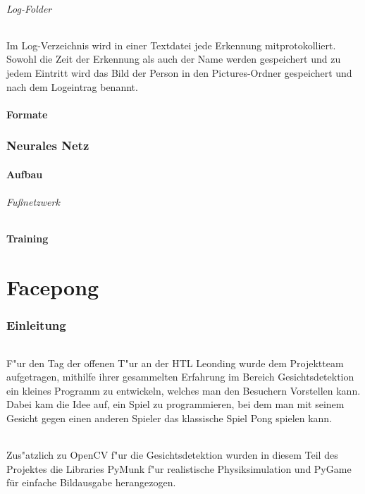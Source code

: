 \documentclass[12pt]{article}
\begin{document}
\paragraph{Log-Folder}
Im Log-Verzeichnis wird in einer Textdatei jede Erkennung mitprotokolliert.
Sowohl die Zeit der Erkennung als auch der Name werden gespeichert und zu
jedem Eintritt wird das Bild der Person in den Pictures-Ordner gespeichert
und nach dem Logeintrag benannt.
\subsection{Formate}
\label{formats}

\section{Neurales Netz}
\subsection{Aufbau}
\paragraph{Fußnetzwerk}
\label{neuralfoot}
\subsection{Training}



\part{Facepong}
\section{Einleitung}
\paragraph{}
F"ur den Tag der offenen T"ur an der HTL Leonding wurde dem Projektteam
aufgetragen, mithilfe ihrer gesammelten Erfahrung im Bereich Gesichtsdetektion
ein kleines Programm zu entwickeln, welches man den Besuchern Vorstellen kann.
Dabei kam die Idee auf, ein Spiel zu programmieren, bei dem man mit seinem Gesicht
gegen einen anderen Spieler das klassische Spiel \glqq Pong\grqq{} spielen kann.
\paragraph{}
Zus"atzlich zu OpenCV f"ur die Gesichtsdetektion wurden in diesem Teil des Projektes
die Libraries PyMunk f"ur realistische Physiksimulation und PyGame für einfache Bildausgabe
herangezogen.
\end{document}
